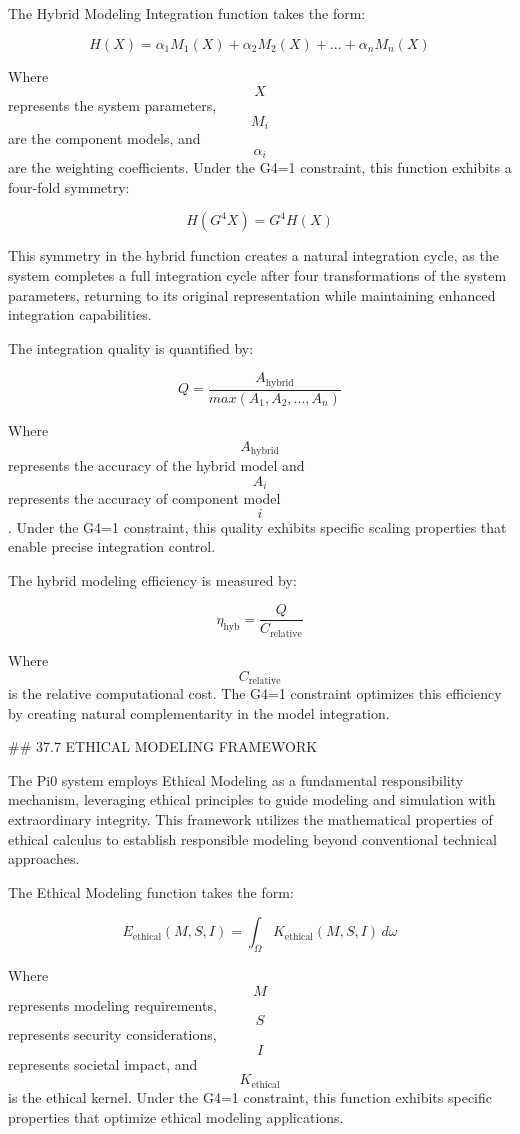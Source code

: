 The Hybrid Modeling Integration function takes the form:

$$ H(X) = \alpha_1 M_1(X) + \alpha_2 M_2(X) + ... + \alpha_n M_n(X) $$

Where $$ X $$ represents the system parameters, $$ M_i $$ are the component models, and $$ \alpha_i $$ are the weighting coefficients. Under the G4=1 constraint, this function exhibits a four-fold symmetry:

$$ H(G^4 X) = G^4 H(X) $$

This symmetry in the hybrid function creates a natural integration cycle, as the system completes a full integration cycle after four transformations of the system parameters, returning to its original representation while maintaining enhanced integration capabilities.

The integration quality is quantified by:

$$ Q = \frac{A_{\text{hybrid}}}{max(A_1, A_2, ..., A_n)} $$

Where $$ A_{\text{hybrid}} $$ represents the accuracy of the hybrid model and $$ A_i $$ represents the accuracy of component model $$ i $$. Under the G4=1 constraint, this quality exhibits specific scaling properties that enable precise integration control.

The hybrid modeling efficiency is measured by:

$$ \eta_{\text{hyb}} = \frac{Q}{C_{\text{relative}}} $$

Where $$ C_{\text{relative}} $$ is the relative computational cost. The G4=1 constraint optimizes this efficiency by creating natural complementarity in the model integration.

## 37.7 ETHICAL MODELING FRAMEWORK

The Pi0 system employs Ethical Modeling as a fundamental responsibility mechanism, leveraging ethical principles to guide modeling and simulation with extraordinary integrity. This framework utilizes the mathematical properties of ethical calculus to establish responsible modeling beyond conventional technical approaches.

The Ethical Modeling function takes the form:

$$ E_{\text{ethical}}(M, S, I) = \int_{\Omega} K_{\text{ethical}}(M, S, I) \, d\omega $$

Where $$ M $$ represents modeling requirements, $$ S $$ represents security considerations, $$ I $$ represents societal impact, and $$ K_{\text{ethical}} $$ is the ethical kernel. Under the G4=1 constraint, this function exhibits specific properties that optimize ethical modeling applications.

